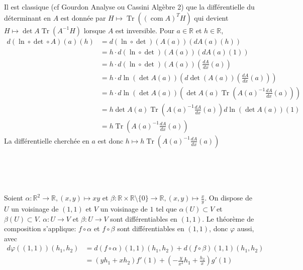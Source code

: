 \documentclass{report}
\DeclareMathOperator{\Tr}{Tr}
\begin{document}
\subsection{} \noindent{}\\ 
\\ 
\\
\noindent Il est classique (cf Gourdon Analyse ou Cassini Algèbre 2) que la différentielle du déterminant en $A$ est donnée par $H\mapsto \Tr((\operatorname{com} A)^TH)$ qui devient $H\mapsto \det A \Tr(A^{-1}H)$ lorsque $A$ est inversible.\newline 
Pour $a\in \mathbb R$ et $h\in \mathbb R$, $$\begin{aligned} 
d(\ln \circ \det \circ A)(a)(h) &= d(\ln \circ \det)(A(a))(dA(a)(h))\\
&= h \cdot d(\ln \circ \det)(A(a))(dA(a)(1)) \\
&= h \cdot d(\ln \circ \det)(A(a))( \frac{dA}{dx}(a) ) \\
&= h \cdot d\ln (\det A(a))\left( d\det (A(a))(\frac{dA}{dx}(a)) \right) \\
&= h \cdot d\ln (\det A(a))\left ( \det A(a) \Tr\left (A(a)^{-1}\frac{dA}{dx}(a)\right) \right)  \\
&= h \det A(a) \Tr\left (A(a)^{-1}\frac{dA}{dx}(a)\right) d\ln (\det A(a))(1) \\
&= h \Tr\left (A(a)^{-1}\frac{dA}{dx}(a)\right)
\end{aligned}$$
La différentielle cherchée en $a$ est donc $h\mapsto h \Tr\left (A(a)^{-1}\frac{dA}{dx}(a)\right)$

\subsection{} \noindent{}\\ 
\\ 
\\
\noindent Soient $\alpha:\mathbb R^2\to \mathbb R, (x,y)\mapsto xy$ et $\beta:\mathbb R\times \mathbb R\setminus\{0\} \to \mathbb R, (x,y)\mapsto \frac{x}{y}$.\newline
On dispose de $U$ un voisinage de $(1,1)$ et $V$ un voisinage de $1$ tel que $\alpha(U)\subset V$ et $\beta(U)\subset V$. $\alpha:U\to V$ et $\beta:U \to V$ sont différentiables en $(1,1)$.\newline 
 Le théorème de composition s'applique: $f\circ \alpha$ et $f\circ \beta$ sont différentiables en $(1,1)$, donc $\varphi$ aussi, avec 
 $$\begin{aligned} d\varphi((1,1))(h_1,h_2) &= d(f\circ \alpha)(1,1)(h_1,h_2)+d(f\circ \beta)(1,1)(h_1,h_2)\\
 &= (yh_1+xh_2)f'(1) + (-\frac{y}{x^2}h_1+\frac{h_2}{x})g'(1)
 \end{aligned}$$
\end{document}
